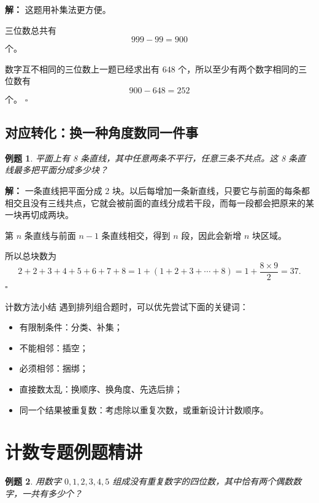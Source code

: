 \documentclass[11pt,a4paper,fontset=fandol]{ctexart}
\theoremstyle{formaltheorem}
\theoremstyle{formalexample}
\newtheorem{example}{例题}[section]
\newenvironment{solution}{\par\noindent\textbf{解：}}{\hfill$\square$\par}
\begin{document}
\begin{solution}
这题用补集法更方便。

三位数总共有
\[
999-99=900
\]
个。

数字互不相同的三位数上一题已经求出有 $648$ 个，所以至少有两个数字相同的三位数有
\[
900-648=252
\]
个。
\end{solution}

\subsection{对应转化：换一种角度数同一件事}
\begin{example}
平面上有 8 条直线，其中任意两条不平行，任意三条不共点。这 8 条直线最多把平面分成多少块？
\end{example}

\begin{solution}
一条直线把平面分成 2 块。以后每增加一条新直线，只要它与前面的每条都相交且没有三线共点，它就会被前面的直线分成若干段，而每一段都会把原来的某一块再切成两块。

第 $n$ 条直线与前面 $n-1$ 条直线相交，得到 $n$ 段，因此会新增 $n$ 块区域。

所以总块数为
\[
2+2+3+4+5+6+7+8
=1+(1+2+3+\cdots +8)
=1+\frac{8\times 9}{2}
=37.
\]
\end{solution}

\begin{skillbox}{计数方法小结}
遇到排列组合题时，可以优先尝试下面的关键词：
\begin{itemize}
  \item 有限制条件：分类、补集；
  \item 不能相邻：插空；
  \item 必须相邻：捆绑；
  \item 直接数太乱：换顺序、换角度、先选后排；
  \item 同一个结果被重复数：考虑除以重复次数，或重新设计计数顺序。
\end{itemize}
\end{skillbox}

\section{计数专题例题精讲}

\begin{example}
用数字 $0,1,2,3,4,5$ 组成没有重复数字的四位数，其中恰有两个偶数数字，一共有多少个？
\end{example}
\end{document}
